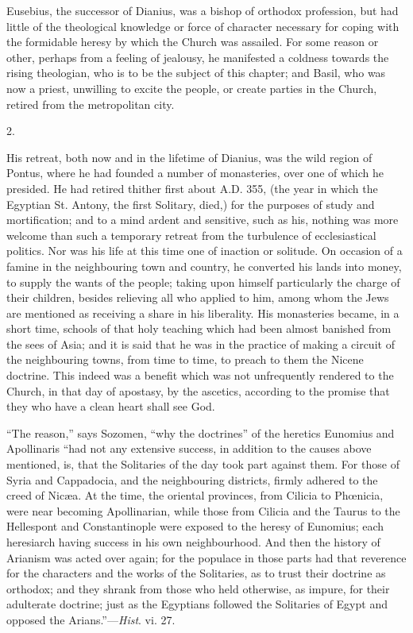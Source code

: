 Eusebius, the successor of Dianius, was a bishop of orthodox
profession, but had little of the theological knowledge or force of
character necessary for coping with the formidable heresy by which
the Church was assailed. For some reason or other, perhaps from a
feeling of jealousy, he manifested a coldness towards the rising
theologian, who is to be the subject of this chapter; and Basil, who
was now a priest, unwilling to excite the people, or create parties in
the Church, retired from the metropolitan city.

2.

His retreat, both now and in the lifetime of Dianius, was the wild
region of Pontus, where he had founded a number of monasteries, over
one of which he presided. He had retired thither first about A.D.
355, (the year in which the Egyptian St. Antony, the first Solitary,
died,) for the purposes of study and mortification; and to a mind
ardent and sensitive, such as his, nothing was more welcome than such
a temporary retreat from the turbulence of ecclesiastical politics.
Nor was his life at this time one of inaction or solitude. On occasion
of a famine in the neighbouring town and country, he converted his
lands into money, to supply the wants of the people; taking upon
himself particularly the charge of their children, besides relieving
all who applied to him, among whom the Jews are mentioned as receiving
a share in his liberality. His monasteries became, in a short time,
schools of that holy teaching which had been almost banished from the
sees of Asia; and it is said that he was in the practice of making a
circuit of the neighbouring towns, from time to time, to preach to
them the Nicene doctrine. This indeed was a benefit which was not
unfrequently rendered to the Church, in that day of apostasy, by the
ascetics, according to the promise that they who have a clean heart
shall see God.

``The reason,'' says Sozomen, ``why the doctrines''
of the heretics Eunomius and Apollinaris
``had not any extensive success, in addition to the causes above
mentioned, is, that the Solitaries of the day took part against them.
For those of Syria and Cappadocia, and the neighbouring districts,
firmly adhered to the creed of Nicæa. At the time, the oriental
provinces, from Cilicia to Phœnicia, were near becoming Apollinarian,
while those from Cilicia and the Taurus to the Hellespont and
Constantinople were exposed to the heresy of Eunomius; each heresiarch
having success in his own neighbourhood. And then the history of
Arianism was acted over again; for the populace in those parts had
that reverence for the characters and the works of the Solitaries, as
to trust their doctrine as orthodox; and they shrank from those who
held otherwise, as impure, for their adulterate doctrine; just as the
Egyptians followed the Solitaries of Egypt and opposed the
Arians.''—\emph{Hist}. vi. 27.


